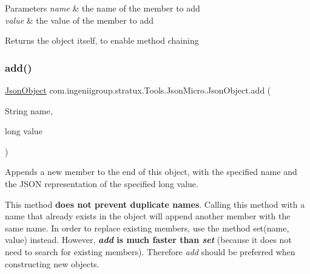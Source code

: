 \begin{DoxyParams}{Parameters}
{\em name} & the name of the member to add \\
\hline
{\em value} & the value of the member to add \\
\hline
\end{DoxyParams}
\begin{DoxyReturn}{Returns}
the object itself, to enable method chaining 
\end{DoxyReturn}
\mbox{\label{classcom_1_1ingeniigroup_1_1stratux_1_1_tools_1_1_json_micro_1_1_json_object_ac6312b94de0f07a6c9549cfe272fca24}} 
\subsubsection{\texorpdfstring{add()}{add()}\hspace{0.1cm}{\footnotesize\ttfamily [2/7]}}
{\footnotesize\ttfamily \hyperlink{classcom_1_1ingeniigroup_1_1stratux_1_1_tools_1_1_json_micro_1_1_json_object}{Json\+Object} com.\+ingeniigroup.\+stratux.\+Tools.\+Json\+Micro.\+Json\+Object.\+add (\begin{DoxyParamCaption}\item[{String}]{name,  }\item[{long}]{value }\end{DoxyParamCaption})}

Appends a new member to the end of this object, with the specified name and the J\+S\+ON representation of the specified {\ttfamily long} value. 

This method {\bfseries does not prevent duplicate names}. Calling this method with a name that already exists in the object will append another member with the same name. In order to replace existing members, use the method {\ttfamily set(name, value)} instead. However, {\bfseries  {\itshape add} is much faster than {\itshape set}} (because it does not need to search for existing members). Therefore {\itshape add} should be preferred when constructing new objects. 


